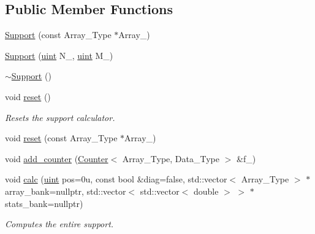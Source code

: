 \subsection*{Public Member Functions}
\begin{DoxyCompactItemize}
\item 
\hyperlink{classbarry_1_1_support_ab946f83af83c571de8bd5a17ce453240}{Support} (const Array\+\_\+\+Type $\ast$Array\+\_\+)
\item 
\hyperlink{classbarry_1_1_support_aa451bd21c09935b686869fef96c5b874}{Support} (\hyperlink{namespacebarry_a11dfc53ddb4672278319aa04f1e09a6c}{uint} N\+\_\+, \hyperlink{namespacebarry_a11dfc53ddb4672278319aa04f1e09a6c}{uint} M\+\_\+)
\item 
\hyperlink{classbarry_1_1_support_a1ffd5ee63fa68338cbbf443e1e54e5b4}{$\sim$\+Support} ()
\item 
void \hyperlink{classbarry_1_1_support_a5878ac60282fc1380c92f3ba502f249e}{reset} ()
\begin{DoxyCompactList}\small\item\em Resets the support calculator. \end{DoxyCompactList}\item 
void \hyperlink{classbarry_1_1_support_afbe207cc2762bc698c9ccb3212e9de78}{reset} (const Array\+\_\+\+Type $\ast$Array\+\_\+)
\item 
void \hyperlink{classbarry_1_1_support_a9fc89bd8b15dcad6a4140a3c74073d10}{add\+\_\+counter} (\hyperlink{classbarry_1_1_counter}{Counter}$<$ Array\+\_\+\+Type, Data\+\_\+\+Type $>$ \&f\+\_\+)
\item 
void \hyperlink{classbarry_1_1_support_ab5261952be0746f188ee024e3e8c26c1}{calc} (\hyperlink{namespacebarry_a11dfc53ddb4672278319aa04f1e09a6c}{uint} pos=0u, const bool \&diag=false, std\+::vector$<$ Array\+\_\+\+Type $>$ $\ast$array\+\_\+bank=nullptr, std\+::vector$<$ std\+::vector$<$ double $>$ $>$ $\ast$stats\+\_\+bank=nullptr)
\begin{DoxyCompactList}\small\item\em Computes the entire support. \end{DoxyCompactList}\end{DoxyCompactItemize}
